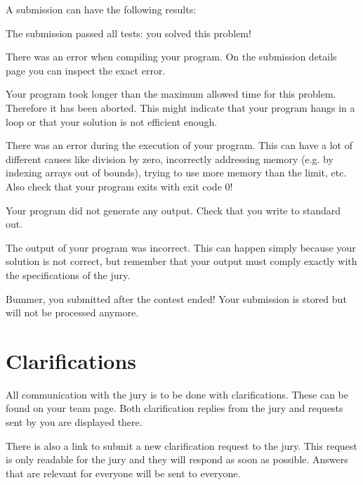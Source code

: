 A submission can have the following results:

\begin{description}[\setleftmargin{4.5cm}]
\item[CORRECT]
The submission passed all tests: you solved this problem!

\item[COMPILER-ERROR]
There was an error when compiling your program. On the submission
details page you can inspect the exact error.

\item[TIMELIMIT]
Your program took longer than the maximum allowed time for this
problem. Therefore it has been aborted. This might indicate that your
program hangs in a loop or that your solution is not efficient
enough.

\item[RUN-ERROR]
There was an error during the execution of your program. This can have
a lot of different causes like division by zero, incorrectly
addressing memory (e.g. by indexing arrays out of bounds), trying to
use more memory than the limit, etc. 
Also check that your program exits with exit code 0!

\item[NO-OUTPUT]
Your program did not generate any output. Check that you write to
standard out.

\item[WRONG-ANSWER]
The output of your program was incorrect. This can happen simply
because your solution is not correct, but remember that your output
must comply exactly with the specifications of the jury.

\item[TOO-LATE]
Bummer, you submitted after the contest ended! Your submission is
stored but will not be processed anymore.
\end{description}

\section{Clarifications}

All communication with the jury is to be done with clarifications.
These can be found on your team page. Both clarification replies from
the jury and requests sent by you are displayed there.

There is also a link to submit a new clarification request to the
jury. This request is only readable for the jury and they will respond
as soon as possible. Answers that are relevant for everyone will be
sent to everyone.

